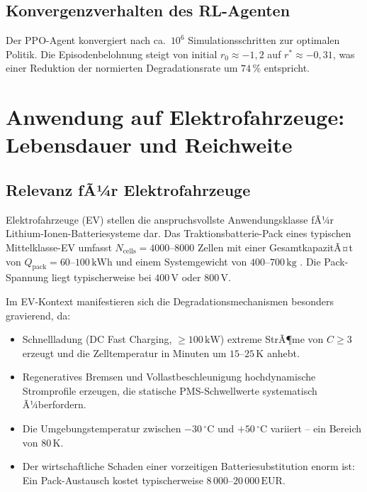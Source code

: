﻿\documentclass[12pt,a4paper]{article}
\begin{document}
	\subsection{Konvergenzverhalten des RL-Agenten}
	
	Der PPO-Agent konvergiert nach ca.\ $10^6$ Simulationsschritten zur optimalen
	Politik. Die Episodenbelohnung steigt von initial $r_0 \approx -1{,}2$ auf
	$r^* \approx -0{,}31$, was einer Reduktion der normierten Degradationsrate
	um $74\,\%$ entspricht.
	
	\section{Anwendung auf Elektrofahrzeuge: Lebensdauer und Reichweite}
	\label{sec:ev}
	
	\subsection{Relevanz fÃ¼r Elektrofahrzeuge}
	
	Elektrofahrzeuge (EV) stellen die anspruchsvollste Anwendungsklasse fÃ¼r
	Lithium-Ionen-Batteriesysteme dar. Das Traktionsbatterie-Pack eines typischen
	Mittelklasse-EV umfasst $N_\mathrm{cells} = 4000\text{--}8000$ Zellen mit
	einer GesamtkapazitÃ¤t von $Q_\mathrm{pack} = 60\text{--}100\,\mathrm{kWh}$
	und einem Systemgewicht von $400\text{--}700\,\mathrm{kg}$ \cite{EV_Tesla2023}.
	Die Pack-Spannung liegt typischerweise bei $400\,\mathrm{V}$ oder $800\,\mathrm{V}$.
	
	Im EV-Kontext manifestieren sich die Degradationsmechanismen besonders gravierend, da:
	
	\begin{itemize}[leftmargin=*]
		\item Schnellladung (DC Fast Charging, $\geq 100\,\mathrm{kW}$) extreme
		StrÃ¶me von $C \geq 3$ erzeugt und die Zelltemperatur in Minuten um
		$15\text{--}25\,\mathrm{K}$ anhebt.
		\item Regeneratives Bremsen und Vollastbeschleunigung hochdynamische
		Stromprofile erzeugen, die statische PMS-Schwellwerte systematisch Ã¼berfordern.
		\item Die Umgebungstemperatur zwischen $-30\,^\circ\mathrm{C}$ und
		$+50\,^\circ\mathrm{C}$ variiert -- ein Bereich von $80\,\mathrm{K}$.
		\item Der wirtschaftliche Schaden einer vorzeitigen Batteriesubstitution
		enorm ist: Ein Pack-Austausch kostet typischerweise
		$8\,000\text{--}20\,000\,\text{EUR}$.
	\end{itemize}
	
\end{document}
